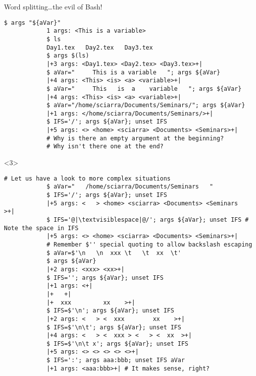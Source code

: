 \begin{frame}[fragile]{Word splitting}{\ldots{}the evil of Bash!}
\begin{onlyenv}
\begin{lstlisting}[style=MyBash, style=oddnumbers, aboveskip=3mm]
            $ args "${aVar}"
            1 args: <This is a variable>
            $ ls
            Day1.tex   Day2.tex   Day3.tex
            $ args $(ls)
            |+3 args: <Day1.tex> <Day2.tex> <Day3.tex>+|
            $ aVar="     This is a variable   "; args ${aVar}
            |+4 args: <This> <is> <a> <variable>+|
            $ aVar="     This   is  a    variable   "; args ${aVar}
            |+4 args: <This> <is> <a> <variable>+|
            $ aVar="/home/sciarra/Documents/Seminars/"; args ${aVar}
            |+1 args: </home/sciarra/Documents/Seminars/>+|
            $ IFS='/'; args ${aVar}; unset IFS
            |+5 args: <> <home> <sciarra> <Documents> <Seminars>+|
            # Why is there an empty argument at the beginning?
            # Why isn't there one at the end?
        \end{lstlisting}
    \end{onlyenv}
    \begin{onlyenv}<3>
        \begin{lstlisting}[style=MyBash, style=oddnumbers, aboveskip=3mm, firstnumber=22]
            # Let us have a look to more complex situations
            $ aVar="   /home/sciarra/Documents/Seminars   "
            $ IFS='/'; args ${aVar}; unset IFS
            |+5 args: <   > <home> <sciarra> <Documents> <Seminars   >+|
            $ IFS='@|\textvisiblespace|@/'; args ${aVar}; unset IFS # Note the space in IFS
            |+5 args: <> <home> <sciarra> <Documents> <Seminars>+|
            # Remember $'' special quoting to allow backslash escaping
            $ aVar=$'\n   \n  xxx \t   \t  xx  \t'
            $ args ${aVar}
            |+2 args: <xxx> <xx>+|
            $ IFS=''; args ${aVar}; unset IFS
            |+1 args: <+|
            |+   +|
            |+  xxx         xx    >+|
            $ IFS=$'\n'; args ${aVar}; unset IFS
            |+2 args: <   > <  xxx        xx    >+|
            $ IFS=$'\n\t'; args ${aVar}; unset IFS
            |+4 args: <   > <  xxx > <   > <  xx  >+|
            $ IFS=$'\n\t x'; args ${aVar}; unset IFS
            |+5 args: <> <> <> <> <>+|
            $ IFS=':'; args aaa:bbb; unset IFS aVar
            |+1 args: <aaa:bbb>+| # It makes sense, right?
        \end{lstlisting}
    \end{onlyenv}
\end{frame}
